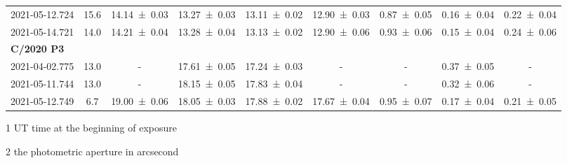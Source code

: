 \begin{table}
\begin{threeparttable}
{\begin{tabular}{ccccccccc}
            2021-05-12.724 & 15.6 & \num{14.14 +- 0.03} & \num{13.27 +- 0.03} & \num{13.11 +- 0.02} & \num{12.90 +- 0.03} & \num{0.87 +- 0.05} & \num{0.16 +- 0.04} & \num{0.22 +- 0.04} \\
            2021-05-14.721 & 14.0 & \num{14.21 +- 0.04} & \num{13.28 +- 0.04} & \num{13.13 +- 0.02} & \num{12.90 +- 0.06} & \num{0.93 +- 0.06} & \num{0.15 +- 0.04} & \num{0.24 +- 0.06} \\
            \multicolumn{9}{l}{\textbf{C/2020 P3}} \\
            2021-04-02.775 & 13.0 & - & \num{17.61 +- 0.05} & \num{17.24 +- 0.03} & - & - & \num{0.37 +- 0.05} & - \\
            2021-05-11.744 & 13.0 & - & \num{18.15 +- 0.05} & \num{17.83 +- 0.04} & - & - & \num{0.32 +- 0.06} & - \\
            2021-05-12.749 & 6.7 & \num{19.00 +- 0.06} & \num{18.05 +- 0.03} & \num{17.88 +- 0.02} & \num{17.67 +- 0.04} & \num{0.95 +- 0.07} & \num{0.17 +- 0.04} & \num{0.21 +- 0.05} \\
            \bottomrule
        \end{tabular}
        }
        \begin{tablenotes}
            \item[1] UT time at the beginning of exposure
            \item[2] the photometric aperture in arcsecond
        \end{tablenotes}
    \end{threeparttable}
\end{table}

